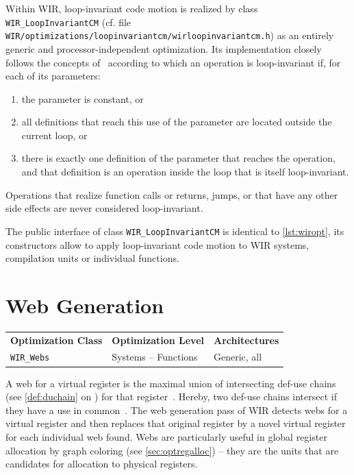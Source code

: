 Within \gls{WIR}, loop-invariant code motion is realized by class \texttt{WIR\_LoopInvariantCM} (cf. file \texttt{WIR/optimizati\-ons/loopinvariantcm/wirloopinvariantcm.h}) as an entirely generic and processor-independent optimization.
Its implementation closely follows the concepts of~\cite[chapter~13.2]{Much97} according to which an operation is loop-invariant if, for each of its parameters:
\begin{enumerate}
  \item the parameter is constant, or
  \item all definitions that reach this use of the parameter are located outside the current loop, or
  \item there is exactly one definition of the parameter that reaches the operation, and that definition is an operation inside the loop that is itself loop-invariant.
\end{enumerate}
Operations that realize function calls or returns, jumps, or that have any other side effects are never considered loop-invariant.

The public interface of class \texttt{WIR\_LoopInvariantCM} is identical to \cref{lst:wiropt}, its constructors allow to apply loop-invariant code motion to \gls{WIR} systems, compilation units or individual functions.


\section{Web Generation}
\label{sec:optwebs}

\begin{tabular}{|l|l|l|}
  \hline
  \textbf{Optimization Class} & \textbf{Optimization Level} & \textbf{Architectures} \\
  \hhline{|=|=|=|}
  \texttt{WIR\_Webs} & Systems -- Functions & Generic, all \\
  \hline
\end{tabular}

A web for a virtual register is the maximal union of intersecting def-use chains (see \cref{def:duchain} on ) for that register~\cite[chapter~8.10]{Much97}.
Hereby, two def-use chains intersect if they have a use in common~\cite[chapter~16.3.3]{Much97}.
The web generation pass of \gls{WIR} detects webs for a virtual register and then replaces that original register by a novel virtual register for each individual web found.
Webs are particularly useful in global register allocation by graph coloring (see \cref{sec:optregalloc}) -- they are the units that are candidates for allocation to physical registers.

